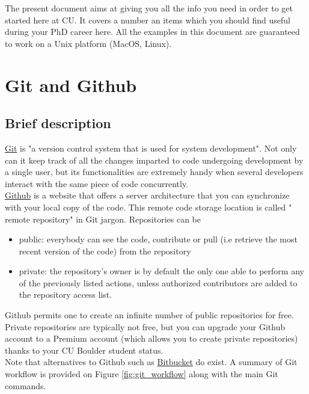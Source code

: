 \documentclass{report}
\begin{document}
The present document aims at giving you all the info you need in order to get started here at CU. It covers a number an items which you should find useful during your PhD career here. All the examples in this document are guaranteed to work on a Unix platform (MacOS, Linux).

\section{Git and Github}
\subsection{Brief description}
\href{https://en.wikipedia.org/wiki/Git_(software)}{Git} is "a version control system that is used for system development". Not only can it keep track of all the changes imparted to code undergoing development by a single user, but its functionalities are extremely handy when several developers interact with the same piece of code concurrently.\\
\href{https://github.com/}{Github} is a website that offers a server architecture that you can synchronize with your local copy of the code. This remote code storage location is called " remote repository" in Git jargon. Repositories can be
\begin{itemize}
\item public: everybody can see the code, contribute or pull (i.e retrieve the most recent version of the code) from the repository
\item private: the repository's owner is by default the only one able to perform any of the previously listed actions, unless authorized contributors are added to the repository access list.
\end{itemize} 
Github permits one to create an infinite number of public repositories for free. Private repositories are typically not free, but you can upgrade your Github account to a Premium account (which allows you to create private repositories) thanks to your CU Boulder student status.\\ Note that alternatives to Github such as \href{https://bitbucket.org}{Bitbucket}  do exist.
A summary of Git workflow is provided on Figure \ref{fig:git_workflow} along with the main Git commands.
\end{document}

